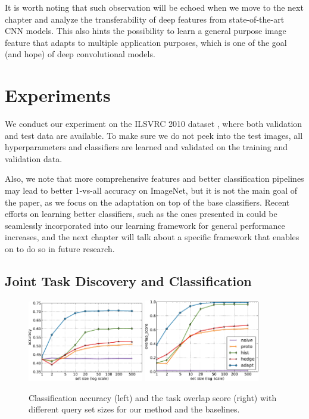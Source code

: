 It is worth noting that such observation will be echoed when we move to the next chapter and analyze the transferability of deep features from state-of-the-art CNN models. This also hints the possibility to learn a general purpose image feature that adapts to multiple application purposes, which is one of the goal (and hope) of deep convolutional models.

\section{Experiments}
We conduct our experiment on the ILSVRC 2010 dataset \cite{ilsvrc}, where both validation and test data are available. To make sure we do not peek into the test images, all hyperparameters and classifiers are learned and validated on the training and validation data.

Also, we note that more comprehensive features and better classification pipelines may lead to better 1-vs-all accuracy on ImageNet, but it is not the main goal of the paper, as we focus on the adaptation on top of the base classifiers. Recent efforts on learning better classifiers, such as the ones presented in \cite{sanchez2011high,krizhevsky2012imagenet} could be seamlessly incorporated into our learning framework for general performance increases, and the next chapter will talk about a specific framework that enables on to do so in future research.

\subsection{Joint Task Discovery and Classification}

\begin{figure}
    \centering
    \includegraphics[width=0.45\textwidth]{figs/taskadaptation/offline_accuracy.pdf}%
    \includegraphics[width=0.45\textwidth]{figs/taskadaptation/offline_overlap_score.pdf}
    \caption{Classification accuracy (left) and the task overlap score (right) with different query set sizes for our method and the baselines.}\label{fig:jointclassify}
\end{figure}

